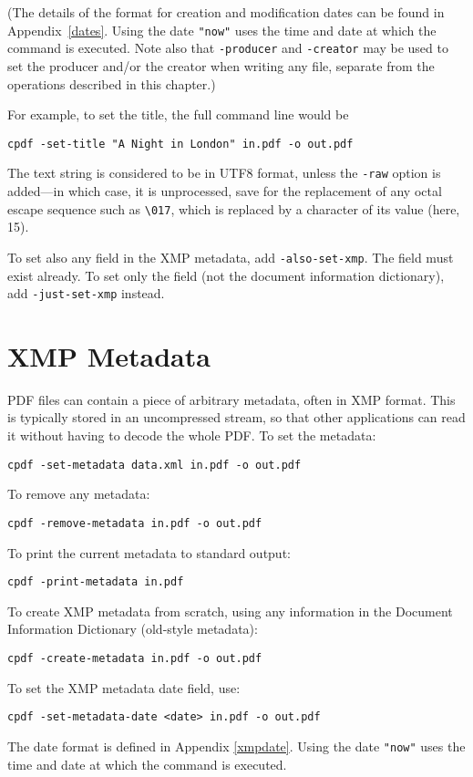 \documentclass{book}
\begin{document}
  \noindent (The details of the format for creation and modification dates can be found
in Appendix~\ref{dates}. Using the date \texttt{"now"} uses the time and date
at which the command is executed. Note also that \texttt{-producer} and \texttt{-creator} may be used to set the producer and/or the creator when writing any file, separate from the operations described in this chapter.)
  
  \vspace{2mm}
  For example, to set the title, the full command line would be
  \begin{framed}
    \small\verb!cpdf -set-title "A Night in London" in.pdf -o out.pdf!
  \end{framed}
\noindent The text string is considered to be in UTF8 format, unless the \texttt{-raw}
option is added---in which case, it is unprocessed, save for the replacement of any octal escape sequence such as \texttt{\textbackslash 017}, which is replaced by a character of its value (here, 15).

To set also any field in the XMP metadata, add \texttt{-also-set-xmp}. The field must exist already. To set only the field (not the document information dictionary), add \texttt{-just-set-xmp} instead.

  \section{XMP Metadata}
  PDF files can contain a piece of arbitrary metadata, often in XMP format.
This is typically stored in an uncompressed stream, so that other applications
can read it without having to decode the whole PDF. To set the metadata:
  \begin{framed}
    \small\verb!cpdf -set-metadata data.xml in.pdf -o out.pdf!
  \end{framed}
  \noindent To remove any metadata:
  \begin{framed}
    \small\verb!cpdf -remove-metadata in.pdf -o out.pdf!
  \end{framed}
  \noindent To print the current metadata to standard output:
  \begin{framed}
    \small\verb!cpdf -print-metadata in.pdf!
  \end{framed}
  \noindent To create XMP metadata from scratch, using any information in the Document Information Dictionary (old-style metadata):
  \begin{framed}
    \small\verb!cpdf -create-metadata in.pdf -o out.pdf!
  \end{framed}
  \noindent To set the XMP metadata date field, use:
  \begin{framed}
    \small\verb!cpdf -set-metadata-date <date> in.pdf -o out.pdf!
  \end{framed}
\noindent The date format is defined in Appendix \ref{xmpdate}. Using the date \texttt{"now"} uses the time and date
at which the command is executed.
\end{document}
